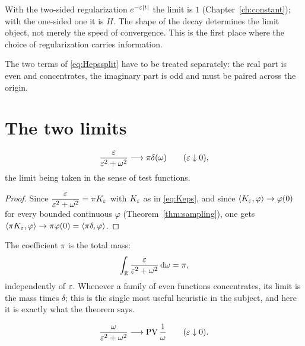 \begin{remark}
With the two-sided regularization $e^{-\varepsilon|t|}$ the limit is $1$
(Chapter~\ref{ch:constant}); with the one-sided one it is $H$. The shape of the decay determines the
limit object, not merely the speed of convergence. This is the first place where the choice of
regularization carries information.
\end{remark}

The two terms of \eqref{eq:Hepssplit} have to be treated separately: the real part is even and
concentrates, the imaginary part is odd and must be paired across the origin.

\section{The two limits}

\begin{theorem}\label{thm:realpart}
\begin{equation}
\frac{\varepsilon}{\varepsilon^{2}+\omega^{2}}\longrightarrow\pi\delta(\omega)
\qquad(\varepsilon\downarrow0),
\label{eq:realpart}
\end{equation}
the limit being taken in the sense of test functions.
\end{theorem}

\begin{proof}
Since $\dfrac{\varepsilon}{\varepsilon^{2}+\omega^{2}}=\pi K_{\varepsilon}$ with $K_{\varepsilon}$ as in \eqref{eq:Keps}, and since
$\langle K_{\varepsilon},\varphi\rangle\to\varphi(0)$ for every bounded continuous $\varphi$
(Theorem~\ref{thm:sampling}), one gets
$\langle \pi K_{\varepsilon},\varphi\rangle\to\pi\varphi(0)=\langle \pi\delta,\varphi\rangle$.
\end{proof}

The coefficient $\pi$ is the total mass:
\begin{equation}
\int_{\mathbb{R}}\frac{\varepsilon}{\varepsilon^{2}+\omega^{2}}\,\mathrm{d}\omega=\pi ,
\label{eq:masspi}
\end{equation}
independently of $\varepsilon$. Whenever a family of even functions concentrates, its limit is the mass
times $\delta$; this is the single most useful heuristic in the subject, and here it is
exactly what the theorem says.

\begin{theorem}\label{thm:imagpart}
\begin{equation}
\frac{\omega}{\varepsilon^{2}+\omega^{2}}\longrightarrow\operatorname{PV}\frac{1}{\omega}
\qquad(\varepsilon\downarrow0).
\label{eq:imagpart}
\end{equation}
\end{theorem}

